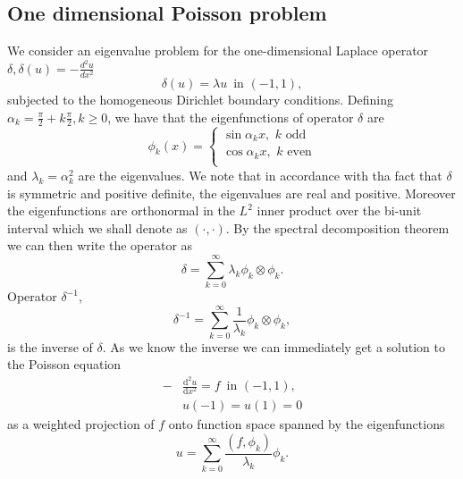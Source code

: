 \documentclass[a4paper,10pt]{article}
\newcommand{\inner}[2]{\ensuremath{\left(#1, #2\right)}}
\newcommand{\deriv}[2]{\ensuremath{\frac{\mathrm{d}#1}{\mathrm{d}#2}}}
\begin{document}
  \subsection{One dimensional Poisson problem}
  We consider an eigenvalue problem for the one-dimensional Laplace operator
  $\delta, \delta(u) = -\tfrac{d^2u}{dx^2}$
  \begin{equation}
  \label{eq:eig_pos1}
    \delta(u) = \lambda u \,\text{ in }(-1, 1),
  \end{equation}
  subjected to the homogeneous Dirichlet boundary conditions.
  Defining $\alpha_k = \frac{\pi}{2} + k\frac{\pi}{2}, k\geq0$, we have that the
  eigenfunctions of operator $\delta$ are
  \[
  \phi_k(x) = \begin{cases}
                \sin{\alpha_k x},\,\,k\,\,\text{odd}\\
                \cos{\alpha_k x},\,\,k\,\,\text{even}\\
              \end{cases}
  \]
  and $\lambda_k = \alpha_k^2$ are the eigenvalues. We note that in accordance
  with tha fact that $\delta$ is symmetric and positive definite, the eigenvalues
  are real and positive. Moreover the eigenfunctions are orthonormal in the $L^2$
  inner product over the bi-unit interval which we shall denote as
  $\inner{\cdot}{\cdot}$. By the spectral decomposition theorem
  we can then write the operator as
  \[
    \delta = \sum_{k=0}^{\infty} \lambda_k \phi_k \otimes \phi_k.
  \]
  Operator $\delta^{-1}$,
  \begin{equation}
    \label{eq:delta_inv}
    \delta^{-1} = \sum_{k=0}^{\infty} \frac{1}{\lambda_k} \phi_k \otimes \phi_k,
  \end{equation}
  is the inverse of $\delta$. As we know the inverse we can immediately get a
  solution to the Poisson equation
  \begin{equation}
  \label{eq:poisson_strong_1}
  \begin{aligned}
    -&\deriv{^2u}{x^2} = f\,\text{ in }(-1, 1),\\
     &u(-1) = u(1) = 0
  \end{aligned}
  \end{equation}
  as a weighted projection of $f$ onto function space spanned by the
  eigenfunctions
  \begin{equation}
  \label{eq:poisson_1d_sol}
  u = \sum_{k=0}^{\infty} \frac{\inner{f}{\phi_k}}{\lambda_k} \phi_k.
  \end{equation}
\end{document}
